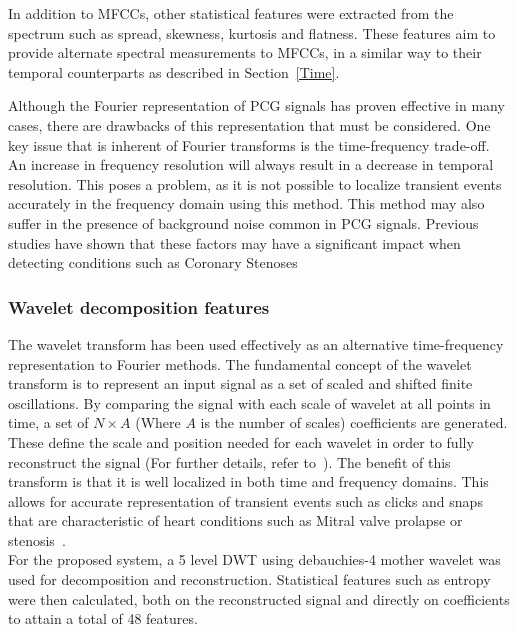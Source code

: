 \documentclass[titlepage, 12pt]{scrartcl} \usepackage{enumitem}
\begin{document}
In addition to MFCCs, other statistical features were extracted from the
spectrum such as spread, skewness, kurtosis and flatness. These features aim to
provide alternate spectral measurements to MFCCs, in a similar way to their
temporal counterparts as described in Section~\ref{Time}.

Although the Fourier representation of PCG signals has proven effective in many
cases, there are drawbacks of this representation that must be considered. One
key issue that is inherent of Fourier transforms is the time-frequency
trade-off. An increase in frequency resolution will always result in a decrease
in temporal resolution. This poses a problem, as it is not possible to localize
transient events accurately in the frequency domain using this method. This
method may also suffer in the presence of background noise common in PCG
signals. Previous studies have shown that these factors may have a significant
impact when detecting conditions such as Coronary
Stenoses~\parencite{Ergen2001, Akay1990}

\subsubsection{Wavelet decomposition features}
The wavelet transform has been used effectively as an alternative
time-frequency representation to Fourier methods. The fundamental concept of
the wavelet transform is to represent an input signal as a set of scaled and
shifted finite oscillations. By comparing the signal with each scale of wavelet
at all points in time, a set of $N\times A$ (Where $A$ is the number of scales)
coefficients are generated. These define the scale and position needed for
each wavelet in order to fully reconstruct the signal (For further details,
refer to~\parencite{Polikar1994}). The benefit of this transform is that it is
well localized in both time and frequency domains. This allows for accurate
representation of transient events such as clicks and snaps that are
characteristic of heart conditions such as Mitral valve prolapse or
stenosis~\parencite{Brown2008}.\\
For the proposed system, a 5 level DWT using debauchies-4 mother wavelet was
used for decomposition and reconstruction. Statistical features such as entropy
were then calculated, both on the reconstructed signal and directly on
coefficients to attain a total of 48 features.~\parencite{Homsi2016}
\end{document}
